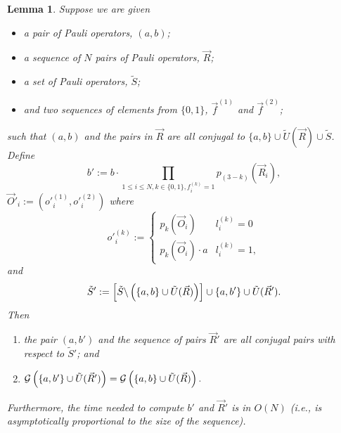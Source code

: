 \documentclass[twocolumn,showpacs,preprintnumbers,amsmath,amssymb,nofootinbib,pra,floatfix]{revtex4-1}
\newtheorem{lemma}{Lemma}
\newcommand{\lst}{\vec}
\newcommand{\set}{\tilde}
\newcommand{\genfun}{\mathcal{G}}
\begin{document}
\begin{lemma}
\label{multiple-recombinations}
Suppose we are given
\begin{itemize}
\item a pair of Pauli operators, $(a,b)$;
\item a sequence of $N$ pairs of Pauli operators, $\lst R$;
\item a set of Pauli operators, $\set S$;
\item and two sequences of elements from $\{0,1\}$, $\lst f^{(1)}$ and $\lst f^{(2)}$;
\end{itemize}
such that $(a,b)$ and the pairs in $\lst R$ are all conjugal to $\{a,b\}\cup\set U(\lst R)\cup\set S$.  Define
$$b':=b\cdot\prod_{1 \le i \le N, k \in \{0,1\}, f^{(k)}_i=1}p_{(3-k)}(\lst R_i),$$
$\lst O'_i := (o'^{(1)}_i,o'^{(2)}_i)$ where
$$o'^{(k)}_i :=
\begin{cases}
p_k(\lst O_i) & l^{(k)}_i = 0\\
p_k(\lst O_i) \cdot a & l^{(k)}_i = 1,
\end{cases}
$$
and
$$\set S' := \left[\set S\backslash\paren{\{a,b\} \cup \set U(\lst R)}\right]\cup \{a,b'\} \cup \set U(\lst R').$$
Then
\begin{enumerate}
\item the pair $(a,b')$ and the sequence of pairs $\lst R'$ are all conjugal pairs with respect to $\set S'$; and
\item $\genfun\paren{\{a,b'\}\cup \set U(\lst R')}=\genfun\paren{\{a,b\}\cup \set U(\lst R)}.$
\end{enumerate}
Furthermore, the time needed to compute $b'$ and $\lst R'$ is in $O(N)$ (i.e., is asymptotically proportional to the size of the sequence).
\end{lemma}
\end{document}
